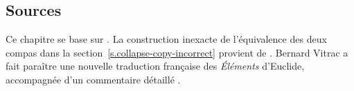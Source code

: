 \subsection*{Sources}

Ce chapitre se base sur \cite{toussaint}. La construction inexacte de l'équivalence des deux compas dans la section~\ref{s.collapse-copy-incorrect} provient de \cite{rusty}. Bernard Vitrac a fait paraître une nouvelle  traduction française  des \emph{Éléments} d'Euclide, accompagnée d'un commentaire détaillé \cite{euclid}.

